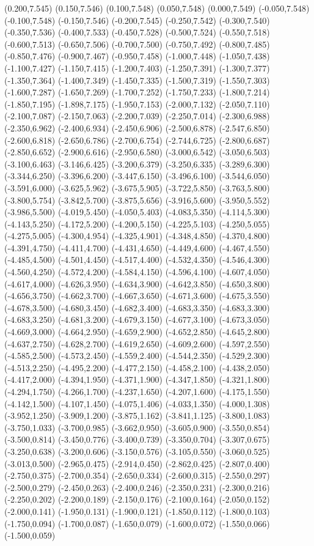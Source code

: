 (0.200,7.545) (0.150,7.546) (0.100,7.548) (0.050,7.548) (0.000,7.549) (-0.050,7.548) (-0.100,7.548) (-0.150,7.546) (-0.200,7.545) (-0.250,7.542) (-0.300,7.540) (-0.350,7.536) (-0.400,7.533) (-0.450,7.528) (-0.500,7.524) (-0.550,7.518) (-0.600,7.513) (-0.650,7.506) (-0.700,7.500) (-0.750,7.492) (-0.800,7.485) (-0.850,7.476) (-0.900,7.467) (-0.950,7.458) (-1.000,7.448) (-1.050,7.438) (-1.100,7.427) (-1.150,7.415) (-1.200,7.403) (-1.250,7.391) (-1.300,7.377) (-1.350,7.364) (-1.400,7.349) (-1.450,7.335) (-1.500,7.319) (-1.550,7.303) (-1.600,7.287) (-1.650,7.269) (-1.700,7.252) (-1.750,7.233) (-1.800,7.214) (-1.850,7.195) (-1.898,7.175) (-1.950,7.153) (-2.000,7.132) (-2.050,7.110) (-2.100,7.087) (-2.150,7.063) (-2.200,7.039) (-2.250,7.014) (-2.300,6.988) (-2.350,6.962) (-2.400,6.934) (-2.450,6.906) (-2.500,6.878) (-2.547,6.850) (-2.600,6.818) (-2.650,6.786) (-2.700,6.754) (-2.744,6.725) (-2.800,6.687) (-2.850,6.652) (-2.900,6.616) (-2.950,6.580) (-3.000,6.542) (-3.050,6.503) (-3.100,6.463) (-3.146,6.425) (-3.200,6.379) (-3.250,6.335) (-3.289,6.300) (-3.344,6.250) (-3.396,6.200) (-3.447,6.150) (-3.496,6.100) (-3.544,6.050) (-3.591,6.000) (-3.625,5.962) (-3.675,5.905) (-3.722,5.850) (-3.763,5.800) (-3.800,5.754) (-3.842,5.700) (-3.875,5.656) (-3.916,5.600) (-3.950,5.552) (-3.986,5.500) (-4.019,5.450) (-4.050,5.403) (-4.083,5.350) (-4.114,5.300) (-4.143,5.250) (-4.172,5.200) (-4.200,5.150) (-4.225,5.103) (-4.250,5.055) (-4.275,5.005) (-4.300,4.954) (-4.325,4.901) (-4.348,4.850) (-4.370,4.800) (-4.391,4.750) (-4.411,4.700) (-4.431,4.650) (-4.449,4.600) (-4.467,4.550) (-4.485,4.500) (-4.501,4.450) (-4.517,4.400) (-4.532,4.350) (-4.546,4.300) (-4.560,4.250) (-4.572,4.200) (-4.584,4.150) (-4.596,4.100) (-4.607,4.050) (-4.617,4.000) (-4.626,3.950) (-4.634,3.900) (-4.642,3.850) (-4.650,3.800) (-4.656,3.750) (-4.662,3.700) (-4.667,3.650) (-4.671,3.600) (-4.675,3.550) (-4.678,3.500) (-4.680,3.450) (-4.682,3.400) (-4.683,3.350) (-4.683,3.300) (-4.683,3.250) (-4.681,3.200) (-4.679,3.150) (-4.677,3.100) (-4.673,3.050) (-4.669,3.000) (-4.664,2.950) (-4.659,2.900) (-4.652,2.850) (-4.645,2.800) (-4.637,2.750) (-4.628,2.700) (-4.619,2.650) (-4.609,2.600) (-4.597,2.550) (-4.585,2.500) (-4.573,2.450) (-4.559,2.400) (-4.544,2.350) (-4.529,2.300) (-4.513,2.250) (-4.495,2.200) (-4.477,2.150) (-4.458,2.100) (-4.438,2.050) (-4.417,2.000) (-4.394,1.950) (-4.371,1.900) (-4.347,1.850) (-4.321,1.800) (-4.294,1.750) (-4.266,1.700) (-4.237,1.650) (-4.207,1.600) (-4.175,1.550) (-4.142,1.500) (-4.107,1.450) (-4.075,1.406) (-4.033,1.350) (-4.000,1.308) (-3.952,1.250) (-3.909,1.200) (-3.875,1.162) (-3.841,1.125) (-3.800,1.083) (-3.750,1.033) (-3.700,0.985) (-3.662,0.950) (-3.605,0.900) (-3.550,0.854) (-3.500,0.814) (-3.450,0.776) (-3.400,0.739) (-3.350,0.704) (-3.307,0.675) (-3.250,0.638) (-3.200,0.606) (-3.150,0.576) (-3.105,0.550) (-3.060,0.525) (-3.013,0.500) (-2.965,0.475) (-2.914,0.450) (-2.862,0.425) (-2.807,0.400) (-2.750,0.375) (-2.700,0.354) (-2.650,0.334) (-2.600,0.315) (-2.550,0.297) (-2.500,0.279) (-2.450,0.263) (-2.400,0.246) (-2.350,0.231) (-2.300,0.216) (-2.250,0.202) (-2.200,0.189) (-2.150,0.176) (-2.100,0.164) (-2.050,0.152) (-2.000,0.141) (-1.950,0.131) (-1.900,0.121) (-1.850,0.112) (-1.800,0.103) (-1.750,0.094) (-1.700,0.087) (-1.650,0.079) (-1.600,0.072) (-1.550,0.066) (-1.500,0.059) 